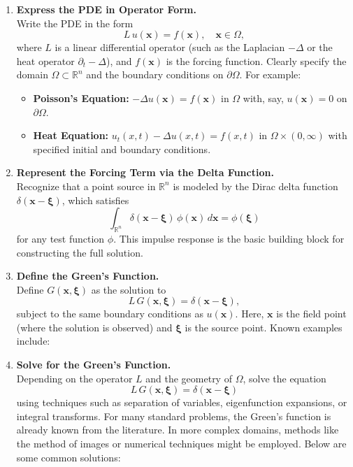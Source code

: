 \begin{enumerate}
    \item \textbf{Express the PDE in Operator Form.}\\[1mm]
    Write the PDE in the form
    \[
    L\,u(\mathbf{x}) = f(\mathbf{x}),\quad \mathbf{x}\in\Omega,
    \]
    where \(L\) is a linear differential operator (such as the Laplacian \(-\Delta\) or the heat operator \( \partial_t - \Delta \)), and \(f(\mathbf{x})\) is the forcing function. Clearly specify the domain \(\Omega \subset \mathbb{R}^n\) and the boundary conditions on \(\partial\Omega\). For example:
    \begin{itemize}
        \item \textbf{Poisson's Equation:} \(-\Delta u(\mathbf{x}) = f(\mathbf{x})\) in \(\Omega\) with, say, \(u(\mathbf{x}) = 0\) on \(\partial\Omega\).
        \item \textbf{Heat Equation:} \(u_t(x,t) - \Delta u(x,t) = f(x,t)\) in \(\Omega \times (0,\infty)\) with specified initial and boundary conditions.
    \end{itemize}
    
    \item \textbf{Represent the Forcing Term via the Delta Function.}\\[1mm]
    Recognize that a point source in \(\mathbb{R}^n\) is modeled by the Dirac delta function \(\delta(\mathbf{x}-\boldsymbol{\xi})\), which satisfies
    \[
    \int_{\mathbb{R}^n} \delta(\mathbf{x}-\boldsymbol{\xi})\,\phi(\mathbf{x})\,d\mathbf{x} = \phi(\boldsymbol{\xi})
    \]
    for any test function \(\phi\). This impulse response is the basic building block for constructing the full solution.
    
    \item \textbf{Define the Green's Function.}\\[1mm]
    Define \(G(\mathbf{x},\boldsymbol{\xi})\) as the solution to
    \[
    L\,G(\mathbf{x},\boldsymbol{\xi}) = \delta(\mathbf{x}-\boldsymbol{\xi}),
    \]
    subject to the same boundary conditions as \(u(\mathbf{x})\). Here, \(\mathbf{x}\) is the field point (where the solution is observed) and \(\boldsymbol{\xi}\) is the source point. Known examples include:

    \item \textbf{Solve for the Green's Function.}\\[1mm]
    Depending on the operator \(L\) and the geometry of \(\Omega\), solve the equation
    \[
    L\,G(\mathbf{x},\boldsymbol{\xi}) = \delta(\mathbf{x}-\boldsymbol{\xi})
    \]
    using techniques such as separation of variables, eigenfunction expansions, or integral transforms. For many standard problems, the Green's function is already known from the literature. In more complex domains, methods like the method of images or numerical techniques might be employed. Below are some common solutions:


\end{enumerate}
